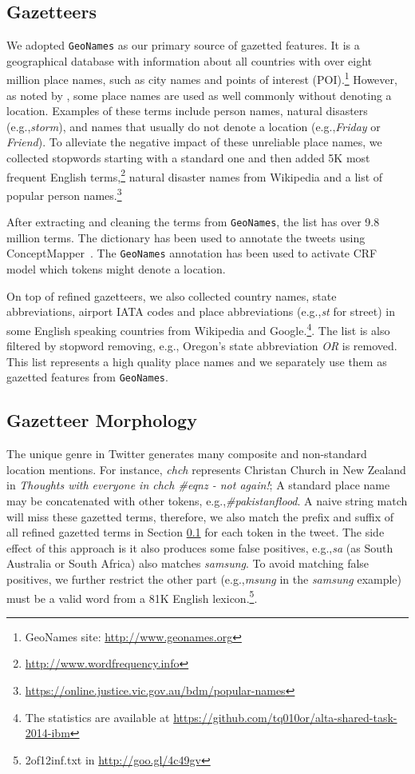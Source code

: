 \documentclass[11pt]{article}
\newcommand{\eg}{e.g.,\xspace}
\newcommand{\geoname}{\texttt{GeoNames}\xspace}
\newcommand{\myex}[1]{\textit{#1}}
\newcommand{\myurl}[1]{{\footnotesize\url{#1}}}
\newcommand{\secref}[2][]{Section#1 \ref{#2}}
\begin{document}
\subsection{Gazetteers}
\label{sec:gaze_feature}

We adopted \geoname as our primary source of gazetted features.
It is a geographical database with information about all countries with over eight million place names, such as city names and points of interest (POI).\footnote{GeoNames site: \myurl{http://www.geonames.org}} 
However, as noted by , some place names are used as well commonly without denoting a location.
Examples of these terms include person names, natural disasters (\eg \myex{storm}), and names that usually do not denote a location (\eg \myex{Friday} or \myex{Friend}).
To alleviate the negative impact of these unreliable place names, we collected stopwords starting with a standard one and then added 5K most frequent English terms,\footnote{\myurl{http://www.wordfrequency.info}} natural disaster names from Wikipedia and a list of popular person names.\footnote{\myurl{https://online.justice.vic.gov.au/bdm/popular-names}}

After extracting and cleaning the terms from \geoname, the list has over 9.8 million terms.
The dictionary has been used to annotate the tweets using ConceptMapper~\cite{tanenblatt2010conceptmapper}.
The \geoname annotation has been used to activate CRF model which tokens might denote a location.

On top of refined gazetteers, we also collected country names, state abbreviations, airport IATA codes and place abbreviations (\eg \myex{st} for street) in some English speaking countries from Wikipedia and Google.\footnote{The statistics are available at \myurl{https://github.com/tq010or/alta-shared-task-2014-ibm}}.
The list is also filtered by stopword removing, \eg Oregon's state abbreviation \myex{OR} is removed.
This list represents a high quality place names and we separately use them as gazetted features from \geoname.

\subsection{Gazetteer Morphology}
\label{sec:mor_feature}

The unique genre in Twitter generates many composite and non-standard location mentions.
For instance, \myex{chch} represents Christan Church in New Zealand in \myex{Thoughts with everyone in chch \#eqnz - not again!}; 
A standard place name may be concatenated with other tokens, \eg \myex{\#pakistanflood}.
A naive string match will miss these gazetted terms, therefore, we also match the prefix and suffix of all refined gazetted terms in \secref{sec:gaze_feature} for each token in the tweet.
The side effect of this approach is it also produces some false positives, \eg \myex{sa} (as South Australia or South Africa) also matches \myex{samsung}.
To avoid matching false positives, we further restrict the other part (\eg \myex{msung} in the \myex{samsung} example) must be a valid word from a 81K English lexicon.\footnote{2of12inf.txt in \myurl{http://goo.gl/4c49gv}}.
\end{document}
